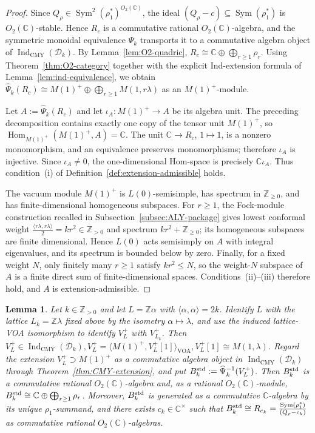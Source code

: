 \documentclass[12pt,leqno]{amsart}
\numberwithin{equation}{section} \newtheorem{thm}{Theorem}[section] \newtheorem{lem}[thm]{Lemma} \newtheorem{ex}[thm]{Example} \newtheorem{prop}[thm]{Proposition} \newtheorem{cor}[thm]{Corollary} \newtheorem{defi}[thm]{Definition} \newtheorem{rmk}[thm]{Remark} \newtheorem{notation}[thm]{Notation}
\newcommand{\Sym}{\operatorname{Sym}}
\newcommand{\Hom}{\operatorname{Hom}}
\newcommand{\Dk}{\mathcal D_k}
\newcommand{\IndCMY}{\operatorname{Ind}_{\mathrm{CMY}}}
\newcommand{\Otwo}{O_2(\C)}
\def\Z{\mathbb{Z}} \def\N{\mathbb{N}} \def\A{\mathbb{A}} \def\C{\mathbb{C}} \def\R{\mathbb{R}} \def\Q{\mathbb{Q}} \def\F{\mathbb{F}}
\begin{document}
\begin{proof}
Since $Q_\rho\in\Sym^2(\rho_1^*)^{\Otwo}$, the ideal $(Q_\rho-c)\subseteq\Sym(\rho_1^*)$ is $\Otwo$-stable. Hence $R_c$ is a commutative rational $\Otwo$-algebra, and the symmetric monoidal equivalence $\widehat\Psi_k$ transports it to a commutative algebra object of $\IndCMY(\Dk)$. By Lemma~\ref{lem:O2-quadric}, \(R_c\cong\C\oplus\bigoplus_{r\ge1}\rho_r\). Using Theorem~\ref{thm:O2-category} together with the explicit Ind-extension formula of Lemma~\ref{lem:ind-equivalence}, we obtain \(\widehat\Psi_k(R_c)\cong M(1)^+\oplus\bigoplus_{r\ge1}M(1,r\lambda)\) as an $M(1)^+$-module.

Let $A:=\widehat\Psi_k(R_c)$ and let $\iota_A:M(1)^+\to A$ be its algebra unit. The preceding decomposition contains exactly one copy of the tensor unit $M(1)^+$, so \(\Hom_{M(1)^+}(M(1)^+,A)=\C.\) The unit $\C\to R_c$, $1\mapsto1$, is a nonzero monomorphism, and an equivalence preserves monomorphisms; therefore $\iota_A$ is injective. Since $\iota_A\ne0$, the one-dimensional Hom-space is precisely \(\C\iota_A\). Thus condition~\textnormal{(i)} of Definition~\ref{def:extension-admissible} holds.

The vacuum module $M(1)^+$ is $L(0)$-semisimple, has spectrum in $\Z_{\ge0}$, and has finite-dimensional homogeneous subspaces. For $r\ge1$, the Fock-module construction recalled in Subsection~\ref{subsec:ALY-package} gives lowest conformal weight \(\frac{\langle r\lambda,r\lambda\rangle}{2}=kr^2\in\Z_{>0}\) and spectrum $kr^2+\Z_{\ge0}$; its homogeneous subspaces are finite dimensional. Hence $L(0)$ acts semisimply on $A$ with integral eigenvalues, and its spectrum is bounded below by zero. Finally, for a fixed weight $N$, only finitely many $r\ge1$ satisfy $kr^2\le N$, so the weight-$N$ subspace of $A$ is a finite direct sum of finite-dimensional spaces. Conditions~\textnormal{(ii)}--\textnormal{(iii)} therefore hold, and $A$ is extension-admissible.
\end{proof}

\begin{lem}
\label{lem:standard-O2-all-k}
Let $k\in\Z_{>0}$ and let $L=\Z\alpha$ with $\langle\alpha,\alpha\rangle=2k$. Identify $L$ with the lattice $L_k=\Z\lambda$ fixed above by the isometry $\alpha\mapsto\lambda$, and use the induced lattice-VOA isomorphism to identify $V_L^+$ with $V_{L_k}^+$. Then \(V_L^+\in\IndCMY(\Dk),V_L^+=\langle M(1)^+,V_L^+[1]\rangle_{\mathrm{VOA}}, V_L^+[1]\cong M(1,\lambda)\). Regard the extension $V_L^+\supset M(1)^+$ as a commutative algebra object in $\IndCMY(\Dk)$ through Theorem~\ref{thm:CMY-extension}, and put \(B_k^{\rm std}:=\widehat\Psi_k^{-1}(V_L^+)\). Then $B_k^{\rm std}$ is a commutative rational $\Otwo$-algebra and, as a rational $\Otwo$-module, \(B_k^{\rm std}\cong\C\oplus\bigoplus_{r\ge1}\rho_r\). Moreover, $B_k^{\rm std}$ is generated as a commutative $\C$-algebra by its unique $\rho_1$-summand, and there exists $c_k\in\C^\times$ such that \(B_k^{\rm std}\cong R_{c_k}=\frac{\Sym(\rho_1^*)}{(Q_\rho-c_k)}\) as commutative rational $\Otwo$-algebras.
\end{lem}
\end{document}
